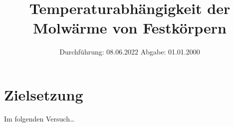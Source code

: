 

\subject{V47}
\title{Temperaturabhängigkeit der Molwärme von Festkörpern}
\date{
    Durchführung: 08.06.2022
     \hspace{3em}
    Abgabe: 01.01.2000 %
}


\maketitle
\thispagestyle{empty}
\tableofcontents
\newpage

\section{Zielsetzung}

    Im folgenden Versuch… %


\clearpage


\clearpage


\clearpage


\clearpage

\printbibliography



